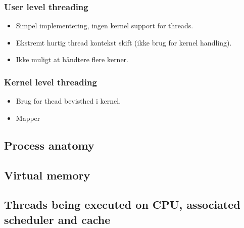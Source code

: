 \subsubsection*{User level threading}
\begin{itemize}
	\item Simpel implementering, ingen kernel support for threads.
	\item Ekstremt hurtig thread kontekst skift (ikke brug for kernel handling).
	\item Ikke muligt at håndtere flere kerner.
\end{itemize}

\subsubsection*{Kernel level threading}
\begin{itemize}
	\item Brug for thead bevisthed i kernel.
	\item Mapper
\end{itemize}

\subsection{Process anatomy}
\subsection{Virtual memory}
\subsection{Threads being executed on CPU, associated scheduler and cache}







